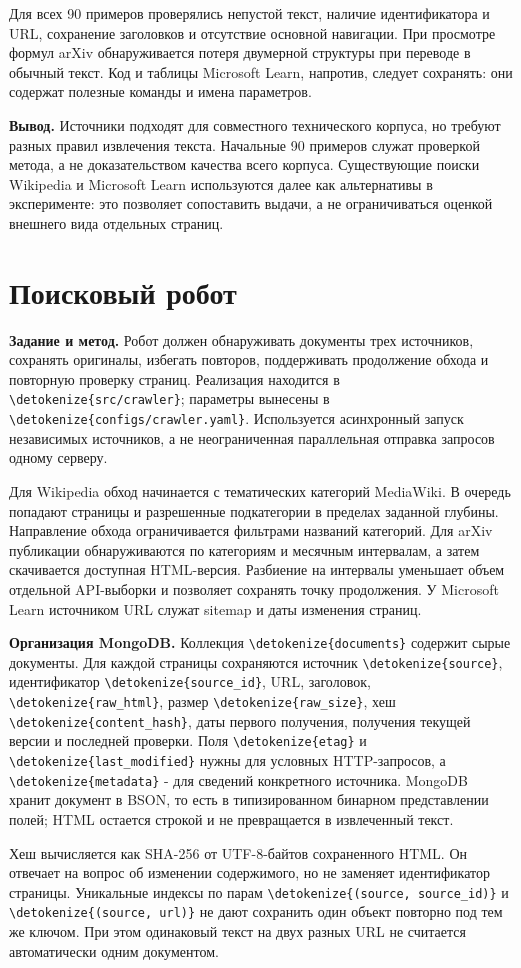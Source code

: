 \documentclass[pdf,unicode,12pt,a4paper,oneside,fleqn]{article}
\newcommand{\labsection}[2]{\par\Needspace{9\baselineskip}\setcounter{section}{\numexpr#1-1\relax}\section{#2}}
\newcommand{\partlabel}[1]{\par\Needspace{4\baselineskip}\medskip\textbf{#1.}\quad}
\DeclareRobustCommand{\code}[1]{\expandafter\nolinkurl\expandafter{\detokenize{#1}}}
\begin{document}
Для всех 90 примеров проверялись непустой текст, наличие идентификатора и URL,
сохранение заголовков и отсутствие основной навигации. При просмотре формул
arXiv обнаруживается потеря двумерной структуры при переводе в обычный текст.
Код и таблицы Microsoft Learn, напротив, следует сохранять: они содержат
полезные команды и имена параметров.

\partlabel{Вывод}
Источники подходят для совместного технического корпуса, но требуют разных
правил извлечения текста. Начальные 90 примеров служат проверкой метода,
а не доказательством качества всего корпуса. Существующие поиски Wikipedia
и Microsoft Learn используются далее как альтернативы в эксперименте:
это позволяет сопоставить выдачи, а не ограничиваться оценкой внешнего вида
отдельных страниц.

\labsection{2}{Поисковый робот}

\partlabel{Задание и метод}
Робот должен обнаруживать документы трех источников, сохранять оригиналы,
избегать повторов, поддерживать продолжение обхода и повторную проверку страниц.
Реализация находится в \code{src/crawler}; параметры вынесены в
\code{configs/crawler.yaml}. Используется асинхронный запуск независимых
источников, а не неограниченная параллельная отправка запросов одному серверу.

Для Wikipedia обход начинается с тематических категорий MediaWiki. В очередь
попадают страницы и разрешенные подкатегории в пределах заданной глубины.
Направление обхода ограничивается фильтрами названий категорий. Для arXiv
публикации обнаруживаются по категориям и месячным интервалам, а затем
скачивается доступная HTML-версия. Разбиение на интервалы уменьшает объем
отдельной API-выборки и позволяет сохранять точку продолжения. У Microsoft
Learn источником URL служат sitemap и даты изменения страниц.

\partlabel{Организация MongoDB}
Коллекция \code{documents} содержит сырые документы. Для каждой страницы
сохраняются источник \code{source}, идентификатор \code{source_id}, URL,
заголовок, \code{raw_html}, размер \code{raw_size}, хеш
\code{content_hash}, даты первого получения, получения текущей версии и
последней проверки. Поля \code{etag} и \code{last_modified} нужны для
условных HTTP-запросов, а \code{metadata} - для сведений конкретного источника.
MongoDB хранит документ в BSON, то есть в типизированном бинарном представлении
полей; HTML остается строкой и не превращается в извлеченный текст.

Хеш вычисляется как SHA-256 от UTF-8-байтов сохраненного HTML. Он отвечает
на вопрос об изменении содержимого, но не заменяет идентификатор страницы.
Уникальные индексы по парам \code{(source, source_id)} и \code{(source, url)}
не дают сохранить один объект повторно под тем же ключом. При этом одинаковый
текст на двух разных URL не считается автоматически одним документом.
\end{document}
